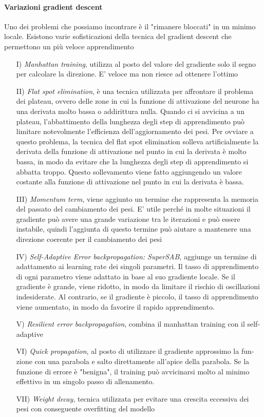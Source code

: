 \paragraph{Variazioni gradient descent}
Uno dei problemi che possiamo incontrare è il "rimanere bloccati" in un minimo locale. Esistono varie sofisticazioni della tecnica del gradient descent che permettono un più veloce apprendimento
\begin{itemize}
    \item[I)] \textit{Manhattan training}, utilizza al posto del valore del gradiente solo il segno per calcolare la direzione. E' veloce ma non riesce ad ottenere l'ottimo
    \item[II)] \textit{Flat spot elimination}, è una tecnica utilizzata per affrontare il problema dei plateau, ovvero delle zone in cui la funzione di attivazione del neurone ha una derivata molto bassa o addirittura nulla. Quando ci si avvicina a un plateau, l'abbattimento della lunghezza degli step di apprendimento può limitare notevolmente l'efficienza dell'aggiornamento dei pesi. Per ovviare a questo problema, la tecnica del flat spot elimination solleva artificialmente la derivata della funzione di attivazione nel punto in cui la derivata è molto bassa, in modo da evitare che la lunghezza degli step di apprendimento si abbatta troppo. Questo sollevamento viene fatto aggiungendo un valore costante alla funzione di attivazione nel punto in cui la derivata è bassa.
    \item[III)] \textit{Momentum term}, viene aggiunto un termine che rappresenta la memoria del passato del cambiamento dei pesi. E' utile perché in molte situazioni il gradiente può avere una grande variazione tra le iterazioni e può essere instabile, quindi l'aggiunta di questo termine può aiutare a mantenere una direzione coerente per il cambiamento dei pesi
    \item[IV)] \textit{Self-Adaptive Error backpropagation: SuperSAB}, aggiunge un termine di adattamento ai learning rate dei singoli parametri. Il tasso di apprendimento di ogni parametro viene adattato in base al suo gradiente locale. Se il gradiente è grande, viene ridotto, in modo da limitare il rischio di oscillazioni indesiderate. Al contrario, se il gradiente è piccolo, il tasso di apprendimento viene aumentato, in modo da favorire il rapido apprendimento.
    \item[V)] \textit{Resilient error backpropagation}, combina il manhattan training con il self-adaptive
    \item[VI)] \textit{Quick propagation}, al posto di utilizzare il gradiente approssimo la fun- zione con una parabola e salto direttamente all’apice della parabola. Se la funzione di errore è "benigna", il training può avvicinarsi molto al minimo effettivo in un singolo passo di allenamento.
    \item[VII)] \textit{Weight decay}, 
    tecnica utilizzata per evitare una crescita eccessiva dei pesi con conseguente overfitting del modello
\end{itemize}

